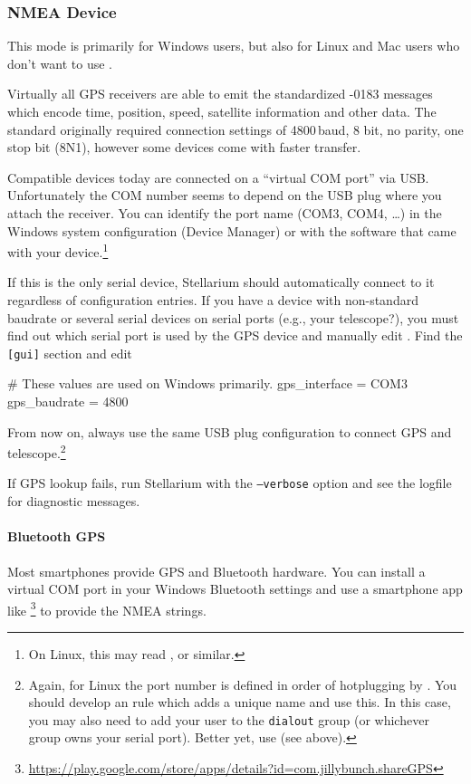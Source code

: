 \subsubsection{NMEA Device}
\label{sec:ExtraData:GPS:NMEA}

This mode is primarily for Windows users, but also for Linux and Mac
users who don't want to use .

Virtually all GPS receivers are able to emit the standardized
-0183 messages which encode time, position, speed,
satellite information and other data.  The standard originally
required connection settings of 4800\,baud, 8 bit, no parity, one stop
bit (8N1), however some devices come with faster transfer.

Compatible devices today are connected on a ``virtual COM port'' via
USB. Unfortunately the COM number seems to depend on the USB plug
where you attach the receiver.  You can identify the port name (COM3,
COM4, \ldots) in the Windows system configuration (Device Manager) or
with the software that came with your device.\footnote{On Linux, this
  may read ,  or similar.}

If this is the only serial device, Stellarium should automatically
connect to it regardless of configuration entries.  If you
have a device with non-standard baudrate or several serial devices on
serial ports (e.g., your telescope?), you must find out which serial port is
used by the GPS device and manually edit .  Find
the \texttt{[gui]} section and edit
\begin{configfile}
[gui]
# These values are used on Windows primarily.
gps_interface     = COM3
gps_baudrate      = 4800
\end{configfile}
From now on, always use the same USB plug configuration to connect GPS
and telescope.\footnote{Again, for Linux the port number is defined in
  order of hotplugging by . You should develop an
   rule which adds a unique name and use this. In this
  case, you may also need to add your user to the \texttt{dialout}
  group (or whichever group owns your serial port).  Better yet, use
   (see above).}

If GPS lookup fails, run Stellarium with the \texttt{--verbose} option and
see the logfile for diagnostic messages.

\paragraph{Bluetooth GPS} Most smartphones provide GPS and Bluetooth
hardware. You can install a virtual COM port in your Windows Bluetooth
settings and use a smartphone app like \footnote{\url{https://play.google.com/store/apps/details?id=com.jillybunch.shareGPS}}
to provide the NMEA strings.


